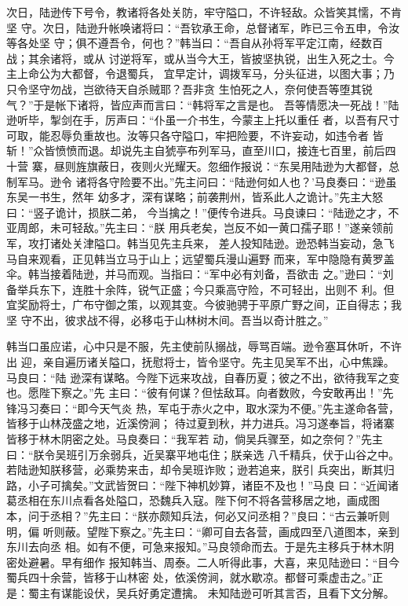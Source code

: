 次日，陆逊传下号令，教诸将各处关防，牢守隘口，不许轻敌。众皆笑其懦，不肯坚
守。次日，陆逊升帐唤诸将曰：“吾钦承王命，总督诸军，昨已三令五申，令汝等各处坚
守；俱不遵吾令，何也？”韩当曰：“吾自从孙将军平定江南，经数百战；其余诸将，或从
讨逆将军，或从当今大王，皆披坚执锐，出生入死之士。今主上命公为大都督，令退蜀兵，
宜早定计，调拨军马，分头征进，以图大事；乃只令坚守勿战，岂欲待天自杀贼耶？吾非贪
生怕死之人，奈何使吾等堕其锐气？”于是帐下诸将，皆应声而言曰：“韩将军之言是也。
吾等情愿决一死战！”陆逊听毕，掣剑在手，厉声曰：“仆虽一介书生，今蒙主上托以重任
者，以吾有尺寸可取，能忍辱负重故也。汝等只各守隘口，牢把险要，不许妄动，如违令者
皆斩！”众皆愤愤而退。却说先主自猇亭布列军马，直至川口，接连七百里，前后四十营
寨，昼则旌旗蔽日，夜则火光耀天。忽细作报说：“东吴用陆逊为大都督，总制军马。逊令
诸将各守险要不出。”先主问曰：“陆逊何如人也？’马良奏曰：“逊虽东吴一书生，然年
幼多才，深有谋略；前袭荆州，皆系此人之诡计。”先主大怒曰：“竖子诡计，损朕二弟，
今当擒之！”便传令进兵。马良谏曰：“陆逊之才，不亚周郎，未可轻敌。”先主曰：“朕
用兵老矣，岂反不如一黄口孺子耶！”遂亲领前军，攻打诸处关津隘口。韩当见先主兵来，
差人投知陆逊。逊恐韩当妄动，急飞马自来观看，正见韩当立马于山上；远望蜀兵漫山遍野
而来，军中隐隐有黄罗盖伞。韩当接着陆逊，并马而观。当指曰：“军中必有刘备，吾欲击
之。”逊曰：“刘备举兵东下，连胜十余阵，锐气正盛；今只乘高守险，不可轻出，出则不
利。但宜奖励将士，广布守御之策，以观其变。今彼驰骋于平原广野之间，正自得志；我坚
守不出，彼求战不得，必移屯于山林树木间。吾当以奇计胜之。”

韩当口虽应诺，心中只是不服，先主使前队搦战，辱骂百端。逊令塞耳休听，不许出
迎，亲自遍历诸关隘口，抚慰将士，皆令坚守。先主见吴军不出，心中焦躁。马良曰：“陆
逊深有谋略。今陛下远来攻战，自春历夏；彼之不出，欲待我军之变也。愿陛下察之。”先
主曰：“彼有何谋？但怯敌耳。向者数败，今安敢再出！”先锋冯习奏曰：“即今天气炎
热，军屯于赤火之中，取水深为不便。”先主遂命各营，皆移于山林茂盛之地，近溪傍涧；
待过夏到秋，并力进兵。冯习遂奉旨，将诸寨皆移于林木阴密之处。马良奏曰：“我军若
动，倘吴兵骤至，如之奈何？”先主曰：“朕令吴班引万余弱兵，近吴寨平地屯住；朕亲选
八千精兵，伏于山谷之中。若陆逊知朕移营，必乘势来击，却令吴班诈败；逊若追来，朕引
兵突出，断其归路，小子可擒矣。”文武皆贺曰：“陛下神机妙算，诸臣不及也！”马良
曰：“近闻诸葛丞相在东川点看各处隘口，恐魏兵入寇。陛下何不将各营移居之地，画成图
本，问于丞相？”先主曰：“朕亦颇知兵法，何必又问丞相？”良曰：“古云兼听则明，偏
听则蔽。望陛下察之。”先主曰：“卿可自去各营，画成四至八道图本，亲到东川去向丞
相。如有不便，可急来报知。”马良领命而去。于是先主移兵于林木阴密处避暑。早有细作
报知韩当、周泰。二人听得此事，大喜，来见陆逊曰：“目今蜀兵四十余营，皆移于山林密
处，依溪傍涧，就水歇凉。都督可乘虚击之。”正是：蜀主有谋能设伏，吴兵好勇定遭擒。
未知陆逊可听其言否，且看下文分解。